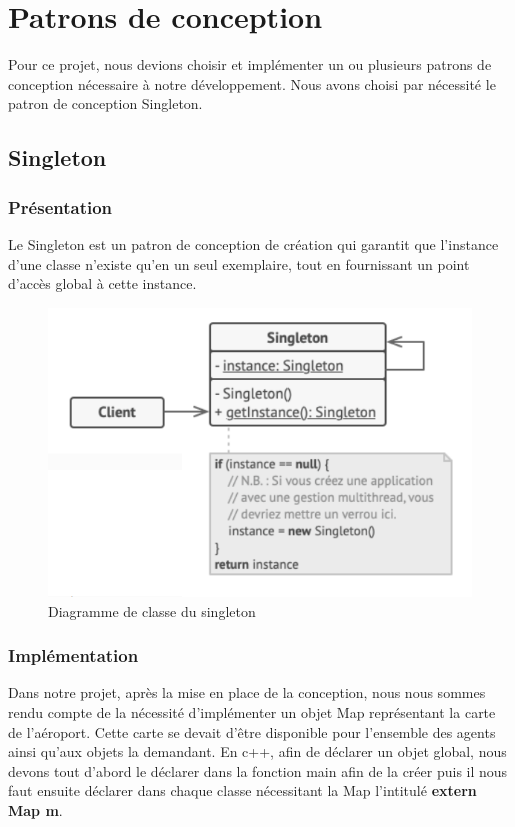\documentclass[12pt,french]{article} %
\begin{document}
\section{Patrons de conception}

Pour ce projet, nous devions choisir et implémenter un ou plusieurs patrons de conception nécessaire à notre développement. Nous avons choisi par nécessité le patron de conception Singleton.

\subsection{Singleton}

\subsubsection{Présentation}

Le Singleton est un patron de conception de création qui garantit que l’instance d’une classe n’existe qu’en un seul exemplaire, tout en fournissant un point d’accès global à cette instance.

\begin{figure}[H]
	\centering
	\includegraphics[scale=0.5]{single.png}
	\caption{Diagramme de classe du singleton}    
\end{figure}

\subsubsection{Implémentation}

Dans notre projet, après la mise en place de la conception, nous nous sommes rendu compte de la nécessité d'implémenter un objet Map représentant la carte de l'aéroport. Cette carte se devait d'être disponible pour l'ensemble des agents ainsi qu'aux objets la demandant. En c++, afin de déclarer un objet global, nous devons tout d'abord le déclarer dans la fonction main afin de la créer puis il nous faut ensuite déclarer dans chaque classe nécessitant la Map l'intitulé \textbf{extern Map m}.
\end{document}
